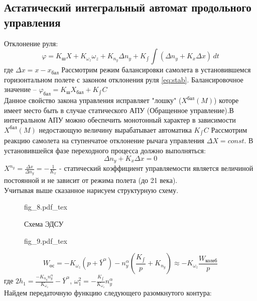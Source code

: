 \documentclass{article}
\begin{document}
\subsection{Астатический интегральный автомат продольного управления}
Отклонение руля:
\begin{equation}
    \varphi = K_\text{ш} X + K_{\omega_z} \omega_z + K_{n_y} \Delta n_y + K_{\int} \int (\Delta n_y + K_x \Delta x) \, dt
	\label{eq:stab}
\end{equation}
где $\Delta x = x - x_\text{бал}$
Рассмотрим режим балансировки самолета в установившемся горизонтальном полете с законом отклонения руля \eqref{eq:stab}.
Балансировочное значение -- $\varphi_\text{бал} = K_\text{ш} X_\text{бал} + K_{\int} C$\\
Данное свойство закона управления исправляет "лошку" ($X^\text{бал}(M)$) которе имеет место быть в случае статического АПУ (Обращенное управление).В интегральном АПУ можно обеспечить монотонный характер в зависимости $X^\text{бал} (M)$ недостающую величину вырабатывает автоматика $K_{\int}C$
Рассмотрим реакцию самолета на ступенчатое отклонение рычага управления $\Delta X = const$. В установившейся фазе переходного процесса должно выполняться:
\[
	\Delta n_y + K_x \Delta x = 0
\]
$ X^{n_y} = \frac{\Delta x}{\Delta n_y} = -\frac{1}{K_x} $ - статический коэффициент управляемости является величиной постоянной и не зависит от режима полета (до 21 века). \\
Учитывая выше сказанное нарисуем структурную схему.\\ 
\begin{figure}[H]
	\begin{minipage}{\textwidth}
		\centering
		{fig_8.pdf_tex}
	\end{minipage}
	\caption{Схема ЭДСУ}
\end{figure}

\begin{figure}[H]
	\begin{minipage}{\textwidth}
		\centering
		{fig_9.pdf_tex}
	\end{minipage}
\end{figure}


\[
	W_\text{ос} = -K_{\omega_z} (p+\bar{Y}^\alpha) - n_y^\alpha (\frac{K_{\int}}{p} + K_{n_y})
	\approx -K_{\omega_z}\frac{W_\text{колеб}}{p}
\]
где $2h_1 = \frac{-K_{n_y} n_y^\alpha}{K_{\omega_z}} - \bar{Y}^\alpha$, $\omega_1^2 = -\frac{K_{\int}} {K_{\omega_z}} n_y^\alpha $\\
Найдем передаточную функцию следующего разомкнутого контура:
\end{document}
